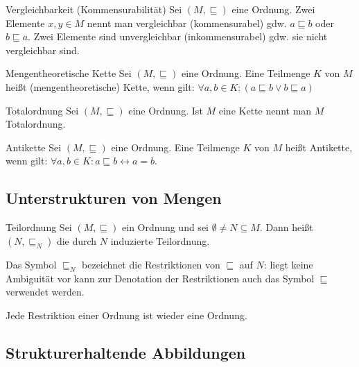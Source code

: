 \documentclass{paper}
\begin{document}
\begin{definition}{Vergleichbarkeit (Kommensurabilität)}
Sei $(M, ⊑)$ eine Ordnung. Zwei Elemente $x, y ∈ M$ nennt man vergleichbar
(kommensurabel) gdw. $a ⊑ b$ oder $b ⊑ a$.
Zwei Elemente sind unvergleichbar (inkommensurabel) gdw. sie nicht vergleichbar
sind.
\end{definition}


\begin{definition}{Mengentheoretische Kette}
Sei $(M,⊑)$ eine Ordnung. Eine Teilmenge $K$ von $M$ heißt (mengentheoretische)
Kette, wenn gilt: $∀ a, b ∈ K: (a ⊑ b ∨ b ⊑ a)$
\end{definition}

\begin{definition}{Totalordnung}
Sei $(M,⊑)$ eine Ordnung. Ist $M$ eine Kette nennt man $M$ Totalordnung.
\end{definition}


\begin{definition}{Antikette}
Sei $(M,⊑)$ eine Ordnung. Eine Teilmenge $K$ von $M$ heißt Antikette,
wenn gilt: $∀ a, b ∈ K: a ⊑ b ↔ a = b$.
\end{definition}




\subsection{Unterstrukturen von Mengen}

\begin{definition}{Teilordnung}
Sei $(M, ⊑)$ ein Ordnung und sei $∅ ≠ N ⊆ M$.
Dann heißt $(N, ⊑_N)$ die durch $N$ induzierte Teilordnung.
\end{definition}

\begin{remark}[Restriktion]
Das Symbol $⊑_N$ bezeichnet die Restriktionen von $⊑$ auf $N$:
liegt keine Ambiguität vor kann zur Denotation der
Restriktionen auch das Symbol $⊑$ verwendet werden.
\end{remark}

\begin{remark}
Jede Restriktion einer Ordnung ist wieder eine Ordnung.
\end{remark}


\subsection{Strukturerhaltende Abbildungen}
\end{document}
